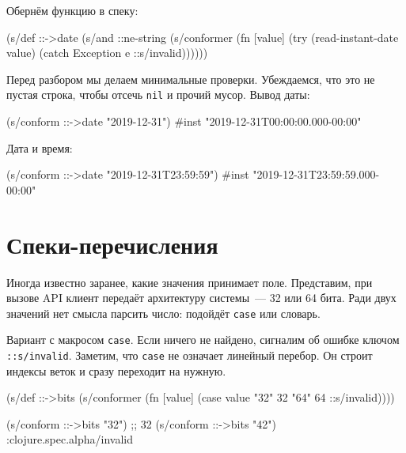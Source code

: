 Обернём функцию в спеку:

\begin{english}
  \begin{clojure}
(s/def ::->date
  (s/and
   ::ne-string
   (s/conformer
    (fn [value]
      (try
        (read-instant-date value)
        (catch Exception e
          ::s/invalid))))))
  \end{clojure}
\end{english}

Перед разбором мы делаем минимальные проверки. Убеждаемся, что это не пустая
строка, чтобы отсечь \verb|nil| и прочий мусор. Вывод даты:

\begin{english}
  \begin{clojure}
(s/conform ::->date "2019-12-31")
#inst "2019-12-31T00:00:00.000-00:00"
  \end{clojure}
\end{english}

\noindent
Дата и время:

\begin{english}
  \begin{clojure}
(s/conform ::->date "2019-12-31T23:59:59")
#inst "2019-12-31T23:59:59.000-00:00"
  \end{clojure}
\end{english}

\section{Спеки-перечисления}


Иногда известно заранее, какие значения принимает поле. Представим, при вызове
API клиент передаёт архитектуру системы~--- 32 или 64 бита. Ради двух значений
нет смысла парсить число: подойдёт \verb|case| или словарь.

Вариант с макросом \verb|case|. Если ничего не найдено, сигналим об ошибке
ключом \verb|::s/invalid|. Заметим, что \verb|case| не означает линейный
перебор. Он строит индексы веток и сразу переходит на нужную.


\begin{english}
  \begin{clojure}
(s/def ::->bits
  (s/conformer
   (fn [value]
     (case value
       "32" 32 "64" 64
       ::s/invalid))))

(s/conform ::->bits "32") ;; 32
(s/conform ::->bits "42") :clojure.spec.alpha/invalid
  \end{clojure}
\end{english}

